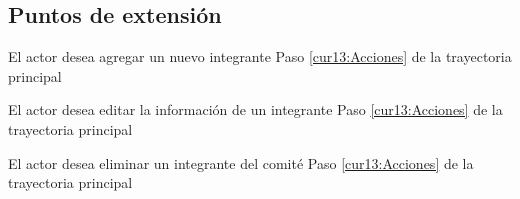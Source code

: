 \subsection{Puntos de extensión}

\UCExtensionPoint
{El actor desea agregar un nuevo integrante}
{ Paso \ref{cur13:Acciones} de la trayectoria principal}
{}

\UCExtensionPoint
{El actor desea editar la información de un integrante}
{ Paso \ref{cur13:Acciones} de la trayectoria principal}
{}

\UCExtensionPoint
{El actor desea eliminar un integrante del comité}
{ Paso \ref{cur13:Acciones} de la trayectoria principal}
{}
